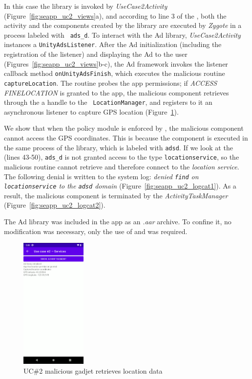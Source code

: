 In this case the library is invoked by {\em UseCase2Activity}
(Figure~\ref{fig:seapp_uc2_views}a), and according to line 3 of the
\seappcontexts, both the activity and the components created by the
library are executed by {\em Zygote} in a process labeled with {\tt
  ads\_d}.  To interact with the Ad library, {\em UseCase2Activity}
instances a {\tt UnityAdsListener}.  After the Ad initialization
(including the registration of the listener) and displaying the Ad to
the user (Figures~\ref{fig:seapp_uc2_views}b-c), the Ad framework
invokes the listener callback method {\tt onUnityAdsFinish}, which
executes the malicious routine {\tt captureLocation}. The routine
probes the app permissions; if {\em ACCESS\textunderscore
  FINE\textunderscore LOCATION} is granted to the app, the malicious
component retrieves through the \servicemanager a handle to the {\tt
  LocationManager}, and registers to it an asynchronous listener to
capture GPS location (Figure~\ref{fig:seapp_uc2_exploit}).

We show that when the policy module is enforced by \seapp, the malicious
component cannot access the GPS coordinates. This is because the
component is executed in the same process of the library, which is
labeled with {\tt ads\textunderscore d}. If we look at the \sepolicy
(lines 43-50), {\tt ads\_d} is not granted access to the \sel type
{\tt location\textunderscore service}, so the malicious routine cannot
retrieve and therefore connect to the {\em location\textunderscore
  service}.  The following denial is written to the system log: {\em
  denied {\tt find} on {\tt location\textunderscore service} to the
  {\tt ads\textunderscore d} domain}
(Figure~\ref{fig:seapp_uc2_logcat1}). As a result, the malicious
component is terminated by the {\em ActivityTaskManager}
(Figure~\ref{fig:seapp_uc2_logcat2}).

The Ad library was included in the app as an {\em .aar}
archive. To confine it, no modification was necessary, only
the use of \manifest and \sepolicy was required.

\begin{figure}[h]
  \centering
\includegraphics[width=0.29\textwidth]{chapters/seapp/figs/ae/uc24.png}
  \caption{\label{fig:seapp_uc2_exploit} UC\#2 malicious gadjet retrieves location data}
\end{figure}  


